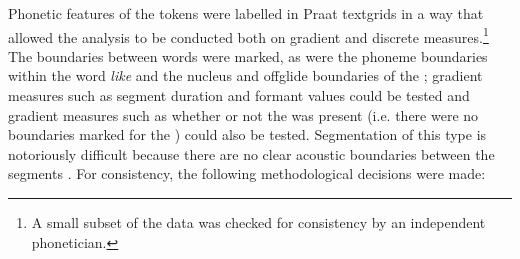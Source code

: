 Phonetic features of the tokens were la\-belled in Praat text\-grids \citep{boersmaweenink} in a way that allowed the analysis to be conducted both on gradient and discrete measures.\footnote{A small subset of the data was checked for consistency by an independent phonetician.} The bound\-aries be\-tween words were marked, as were the phoneme boundaries within the word \textit{like} and the nucleus and offglide boundaries of the ; gradient measures such as segment duration and formant values could be tested and gradient measures such as whether or not the  was present (i.e. there were no boundaries marked for the ) could also be tested. Segmentation of this type is notoriously difficult because there are no clear acoustic boundaries between the segments \citep[142]{ladefoged2003}. For consistency, the following methodological decisions were made:

